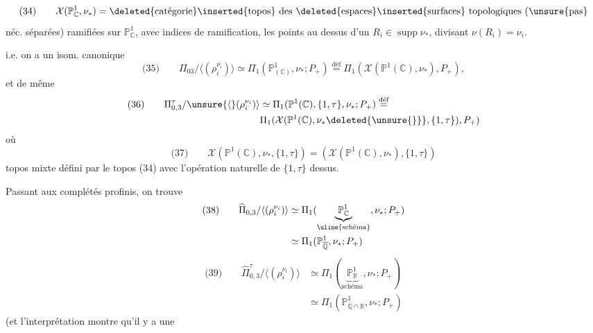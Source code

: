 \[
\text{(34)}\qquad
\mathcal X(\mathbb P^1_{\mathbb C},\nu_*)=
\deleted{\text{catégorie}}\inserted{\text{topos}}\ \text{des }\deleted{\text{espaces}}\inserted{\text{surfaces}}\ \text{topologiques (\unsure{pas}}
\]
néc. séparées) ramifiées sur $\mathbb P^1_{\mathbb C}$, avec indices de ramification,  les points au dessus d'un $R_i\in\operatorname{supp}\nu_*$, divisant $\nu(R_i)=\nu_i$.


i.e. on a un isom. canonique
\[
\text{(35)}\qquad
\Pi_{03}/\langle(\rho_i^{\nu_i})\rangle
\simeq\Pi_1(\mathbb P^1_{(\mathbb C)},\nu_*;P_+)
\overset{\text{déf}}{=}\Pi_1(\mathcal X(\mathbb P^1(\mathbb C),\nu_*),P_+),
\]
et de même
\[
\begin{aligned}
\text{(36)}\qquad
\Pi_{0,3}^{\tau}/\unsure{\langle}(\rho_i^{\nu_i})\rangle
&\simeq\Pi_1(\mathbb P^1(\mathbb C),\{1,\tau\},\nu_*;P_+)\overset{\text{déf}}{=}\\
&\Pi_1(\mathcal X(\mathbb P^1(\mathbb C),\nu_*\deleted{\unsure{\}}},\{1,\tau\}),P_+)
\end{aligned}
\]
où
\[
\text{(37)}\qquad
\mathcal X(\mathbb P^1(\mathbb C),\nu_*,\{1,\tau\})
=(\mathcal X(\mathbb P^1(\mathbb C),\nu_*),\{1,\tau\})
\]
topos mixte défini par le topos (34) avec l'opération naturelle de $\{1,\tau\}$ dessus.


Passant aux complétés profinis, on trouve
\[
\begin{aligned}
\text{(38)}\qquad
\widehat\Pi_{0,3}/\langle(\rho_i^{\nu_i})\rangle
&\simeq\Pi_1(\underbrace{\mathbb P^1_{\mathbb C}}_{\uline{\text{schéma}}},\nu_*;P_+)\\
&\simeq\Pi_1(\mathbb P^1_{\overline{\mathbb Q}},\nu_*;P_+)
\end{aligned}
\]
\[
\begin{aligned}
\text{(39)}\qquad
\widehat\Pi_{0,3}^{\tau}/\langle(\rho_i^{\nu_i})\rangle
&\simeq\Pi_1(\underbrace{\mathbb P^1_{\mathbb R}}_{\text{schéma}},\nu_*;P_+)\\
&\simeq\Pi_1(\mathbb P^1_{\overline{\mathbb Q}\cap\mathbb R},\nu_*;P_+)
\end{aligned}
\]
(et  l'interprétation  montre qu'il y a une

